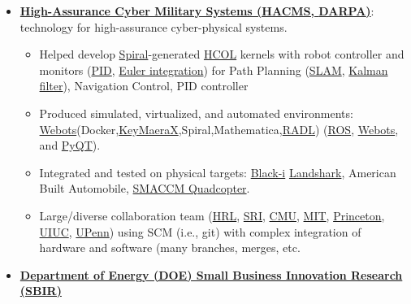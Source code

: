 \documentclass{article}
\begin{document}
\begin{itemize}

\item \textbf{\href{http://www.darpa.mil/Our_Work/I2O/Programs/High-Assurance_Cyber_Military_Systems_(HACMS).aspx}{High-Assurance Cyber Military Systems (HACMS, \href{http://www.darpa.mil/default.aspx}{DARPA})}}: technology for high-assurance cyber-physical systems. 

  \begin{itemize}

    \item Helped develop \href{http://spiral.net/}{Spiral}-generated \href{https://wiki.hh.se/wg211/images/e/e0/M13Franchetti.pdf}{HCOL} kernels with robot controller and monitors (\href{http://en.wikipedia.org/wiki/PID_controller}{PID}, 
\href{http://en.wikipedia.org/wiki/Euler_method}{Euler integration}) for Path Planning (\href{https://en.wikipedia.org/wiki/Simultaneous_localization_and_mapping}{SLAM}, \href{https://en.wikipedia.org/wiki/Kalman_filter}{Kalman filter}), Navigation Control, PID controller 

    \item Produced simulated, virtualized, and automated environments: \href{http://www.cyberbotics.com/}{Webots}(Docker,\href{http://www.ls.cs.cmu.edu/KeYmaeraX/}{KeyMaeraX},Spiral,Mathematica,\href{https://www.acsac.org/2014/workshops/law/Shankar_LAW2014.pdf}{RADL}) 
 (\href{http://www.ros.org/}{ROS}, \href{http://www.cyberbotics.com/}{Webots}, and \href{https://wiki.python.org/moin/PyQt}{PyQT}).

    \item Integrated and tested on physical targets: \href{http://blackirobotics.com/DARPA-SN-12-26_HACMS.php}{Black-i} \href{http://www.blackirobotics.com/LandShark_UGV_UC0M.html}{Landshark}, American Built Automobile, \href{http://smaccmpilot.org/}{SMACCM Quadcopter}. 

    \item Large/diverse collaboration team (\href{http://www.hrl.com/}{HRL}, \href{http://www.sri.com/}{SRI}, \href{http://www.cmu.edu/}{CMU}, \href{http://web.mit.edu/}{MIT}, \href{http://www.princeton.edu/}{Princeton}, \href{http://illinois.edu/}{UIUC}, \href{http://www.upenn.edu/}{UPenn}) using SCM (i.e., git) with complex integration of hardware and software (many branches, merges, etc.

  \end{itemize}

\item \textbf{\href{http://science.energy.gov/sbir/}{Department of Energy (DOE) Small Business Innovation Research (SBIR)}}


\end{itemize}
\end{document}

